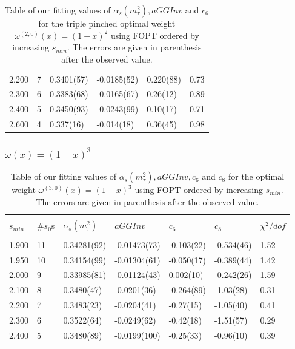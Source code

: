 \documentclass[../../index.tex]{subfiles}
\begin{document}
\begin{table}[H]
\begin{tabular}{llllll}
    2.200 & 7  & 0.3401(57) & -0.0185(52) & 0.220(88) & 0.73 \\
    2.300 & 6  & 0.3383(68) & -0.0165(67) & 0.26(12) & 0.89 \\
    2.400 & 5  & 0.3450(93) & -0.0243(99) & 0.10(17) & 0.71 \\
    2.600 & 4  & 0.337(16) & -0.014(18) & 0.36(45) & 0.98 \\
    \bottomrule
  \end{tabular}
  \caption{Table of our fitting values of $\alpha_s(m_\tau^2), aGGInv$ and $c_{6}$
    for the triple pinched optimal weight $\omega^{(2,0)}(x)=(1-x)^2$ using FOPT ordered
    by increasing $s_{min}$. The errors are given in parenthesis after the observed value.}
  \label{table:fitOpt30AlD4D6}
\end{table}

\subsubsection{$\omega(x) = (1-x)^3$}
\begin{table}[H]
  \centering
  \begin{tabular}{lllllll}
    \toprule \\
    $s_{min}$ & \#$s_0$s & $\alpha_s(m_\tau^2)$ & $aGGInv$ & $c_{6}$ & $c_{8}$ & $\chi^2/dof$  \\
    \hline \\
    1.900 & 11 & 0.34281(92) & -0.01473(73) & -0.103(22) & -0.534(46) & 1.52 \\
    1.950 & 10 & 0.34154(99) & -0.01304(61) & -0.050(17) & -0.389(44) & 1.42 \\
    2.000 & 9  & 0.33985(81) & -0.01124(43) & 0.002(10) & -0.242(26) & 1.59 \\
    2.100 & 8  & 0.3480(47) & -0.0201(36) & -0.264(89) & -1.03(28) & 0.31 \\
    2.200 & 7  & 0.3483(23) & -0.0204(41) & -0.27(15) & -1.05(40) & 0.41 \\
    2.300 & 6  & 0.3522(64) & -0.0249(62) & -0.42(18) & -1.51(57) & 0.29 \\
    2.400 & 5  & 0.3480(89) & -0.0199(100) & -0.25(33) & -0.96(10) & 0.39 \\
    \bottomrule
  \end{tabular}
  \caption{Table of our fitting values of $\alpha_s(m_\tau^2), aGGInv, c_6$ and $c_{8}$
    for the optimal weight $\omega^{(3,0)}(x)=(1-x)^3$ using FOPT ordered
    by increasing $s_{min}$. The errors are given in parenthesis after the observed value.}
  \label{table:fitOpt30AlD4D6D8}
\end{table}
\end{document}
